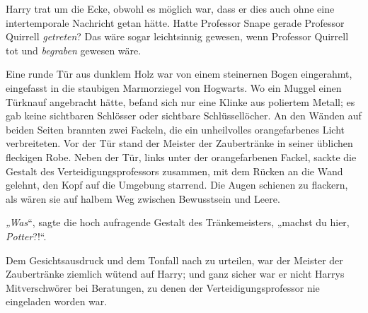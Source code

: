 Harry trat um die Ecke, obwohl es möglich war, dass er dies auch ohne eine intertemporale Nachricht getan hätte.
Hatte Professor Snape gerade Professor Quirrell \emph{getreten}? Das wäre sogar leichtsinnig gewesen, wenn Professor Quirrell tot und \emph{begraben} gewesen wäre.

Eine runde Tür aus dunklem Holz war von einem steinernen Bogen eingerahmt, eingefasst in die staubigen Marmorziegel von Hogwarts. Wo ein Muggel einen Türknauf angebracht hätte, befand sich nur eine Klinke aus poliertem Metall; es gab keine sichtbaren Schlösser oder sichtbare Schlüssellöcher. An den Wänden auf beiden Seiten brannten zwei Fackeln, die ein unheilvolles orangefarbenes Licht verbreiteten.
Vor der Tür stand der Meister der Zaubertränke in seiner üblichen fleckigen Robe. Neben der Tür, links unter der orangefarbenen Fackel, sackte die Gestalt des Verteidigungsprofessors zusammen, mit dem Rücken an die Wand gelehnt, den Kopf auf die Umgebung starrend. Die Augen schienen zu flackern, als wären sie auf halbem Weg zwischen Bewusstsein und Leere.

\emph{„Was}“, sagte die hoch aufragende Gestalt des Tränkemeisters, „machst du hier, \emph{Potter}?!“.

Dem Gesichtsausdruck und dem Tonfall nach zu urteilen, war der Meister der Zaubertränke ziemlich wütend auf Harry; und ganz sicher war er nicht Harrys Mitverschwörer bei Beratungen, zu denen der Verteidigungsprofessor nie eingeladen worden war.

